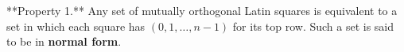 **Property 1.** Any set of mutually orthogonal Latin squares is equivalent to a set in which each square has $(0, 1, \ldots, n-1)$ for its top row. Such a set is said to be in \textbf{normal form}.
